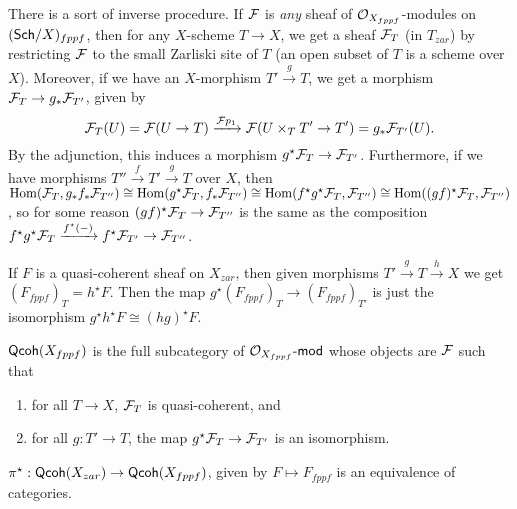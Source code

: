  There is a sort of inverse procedure. If $\mathcal{F}$ is \emph{any} sheaf of
 $\mathcal{O}_{X_{fppf}}$-modules on $(\text{\sf Sch}/X)_{fppf}$, then for any $X$-scheme $T\to X$, we get a
 sheaf $\mathcal{F}_T$ (in $T_{zar}$) by restricting $\mathcal{F}$ to the small Zarliski site of $T$ (an
 open subset of $T$ is a scheme over $X$). Moreover, if we have an $X$-morphism
 $T'\xrightarrow{g} T$, we get a morphism $\mathcal{F}_T\to g_*\mathcal{F}_{T'}$, given by
 \[
   \mathcal{F}_T(U)=\mathcal{F}(U\to T)\xrightarrow{\mathcal{F} p_1} \mathcal{F}(U\times_T T'\to T') = g_* \mathcal{F}_{T'}(U).
 \]
 By the adjunction, this induces a morphism $g^\star\mathcal{F}_T\to \mathcal{F}_{T'}$. Furthermore, if we
 have morphisms $T''\xrightarrow f T'\xrightarrow g T$ over $X$, then
 $\operatorname{Hom}(\mathcal{F}_T,g_*f_*\mathcal{F}_{T''})\cong \operatorname{Hom}(g^\star \mathcal{F}_T,f_*\mathcal{F}_{T''})\cong \operatorname{Hom}(f^\star g^\star
 \mathcal{F}_{T},\mathcal{F}_{T''})\cong \operatorname{Hom}((gf)^\star \mathcal{F}_T,\mathcal{F}_{T''})$, so for some reason \anton{}
 $(gf)^\star\mathcal{F}_T \to \mathcal{F}_{T''}$ is the same as the composition $f^\star
 g^\star\mathcal{F}_{T}\xrightarrow{f^\star(-)} f^\star\mathcal{F}_{T'} \to \mathcal{F}_{T''}$.
 \begin{remark}
   If $F$ is a quasi-coherent sheaf on $X_{zar}$, then given morphisms $T'\xrightarrow g
   T\xrightarrow h X$ we get $(F_{fppf})_T = h^\star F$. Then the map $g^\star
   (F_{fppf})_T\to (F_{fppf})_{T'}$ is just the isomorphism $g^\star h^\star F \cong (h
   g)^\star F$.
 \end{remark}
 \begin{definition}
   $\text{\sf Qcoh}(X_{fppf})$ is the full subcategory of $\mathcal{O}_{X_{fppf}}\textrm{-\sf mod}$ whose objects are $\mathcal{F}$
   such that
   \begin{enumerate}
     \item for all $T\to X$, $\mathcal{F}_T$ is quasi-coherent, and
     \item for all $g:T'\to T$, the map $g^\star \mathcal{F}_T\to \mathcal{F}_{T'}$ is an isomorphism.
     \qedhere
   \end{enumerate}
 \end{definition}
 \begin{proposition} \label{lec07P:qcoh_equivalence}
   $\pi^\star:\text{\sf Qcoh}(X_{zar})\to \text{\sf Qcoh}(X_{fppf})$, given by $F\mapsto F_{fppf}$ is an
   equivalence of categories.
 \end{proposition}
